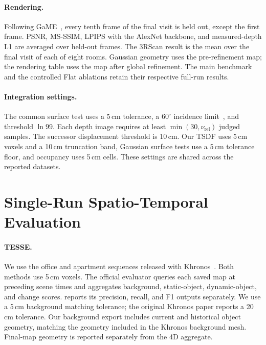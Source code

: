 \paragraph{Rendering.}
Following GaME~\cite{yugay2026game}, every tenth frame of the final visit is held out, except the first frame.
PSNR, MS-SSIM, LPIPS with the AlexNet backbone, and measured-depth L1 are averaged over held-out frames.
The 3RScan result is the mean over the final visit of each of eight rooms. Gaussian geometry uses the
pre-refinement map; the rendering table uses the map after global refinement. The main benchmark and the
controlled Flat ablations retain their respective full-run results.

\paragraph{Integration settings.}
The common surface test uses a 5\,cm tolerance, a $60^\circ$ incidence limit~\cite{nguyen2012kinect}, and threshold $\ln 99$.
Each depth image requires at least $\min(30,\nu_{\mathrm{rel}})$ judged samples. The successor displacement
threshold is 10\,cm. Our TSDF uses 5\,cm voxels and a 10\,cm truncation band, Gaussian surface tests use a
5\,cm tolerance floor, and occupancy uses 5\,cm cells. These settings are shared across the reported datasets.

\section{Single-Run Spatio-Temporal Evaluation}




\paragraph{TESSE.}
We use the office and apartment sequences released with Khronos~\cite{schmid2024khronos}. Both methods use
5\,cm voxels. The official evaluator queries each saved map at preceding scene times and aggregates background,
static-object, dynamic-object, and change scores.  reports its precision, recall, and F1
outputs separately. We use a 5\,cm background matching tolerance; the original Khronos paper reports a
20\,cm tolerance. Our background export includes current and historical object geometry, matching the geometry
included in the Khronos background mesh. Final-map geometry is reported separately from the 4D aggregate.

